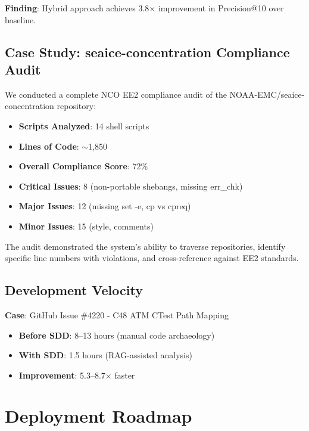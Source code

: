\documentclass[11pt,letterpaper]{article}
\begin{document}
\textbf{Finding}: Hybrid approach achieves 3.8$\times$ improvement in Precision@10 over baseline.

\subsection{Case Study: seaice-concentration Compliance Audit}

We conducted a complete NCO EE2 compliance audit of the NOAA-EMC/seaice-concentration repository:

\begin{itemize}
    \item \textbf{Scripts Analyzed}: 14 shell scripts
    \item \textbf{Lines of Code}: $\sim$1,850
    \item \textbf{Overall Compliance Score}: 72\%
    \item \textbf{Critical Issues}: 8 (non-portable shebangs, missing err\_chk)
    \item \textbf{Major Issues}: 12 (missing set -e, cp vs cpreq)
    \item \textbf{Minor Issues}: 15 (style, comments)
\end{itemize}

The audit demonstrated the system's ability to traverse repositories, identify specific line numbers with violations, and cross-reference against EE2 standards.

\subsection{Development Velocity}

\textbf{Case}: GitHub Issue \#4220 - C48 ATM CTest Path Mapping

\begin{itemize}
    \item \textbf{Before SDD}: 8--13 hours (manual code archaeology)
    \item \textbf{With SDD}: 1.5 hours (RAG-assisted analysis)
    \item \textbf{Improvement}: 5.3--8.7$\times$ faster
\end{itemize}

\section{Deployment Roadmap}
\end{document}
